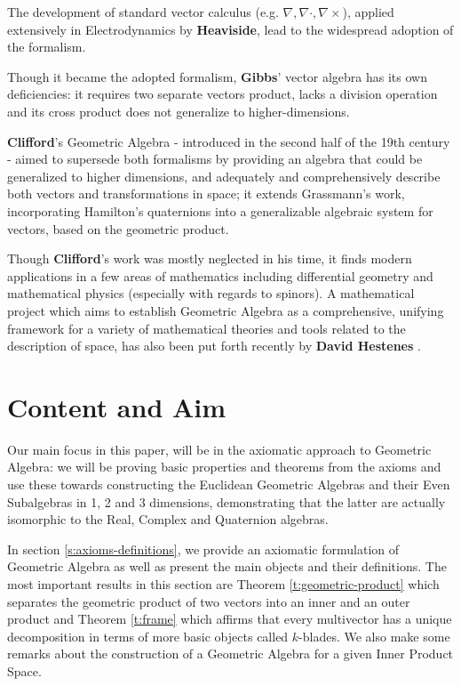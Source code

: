 The development of standard vector calculus (e.g. $\nabla, \nabla \cdot, \nabla \times$), applied extensively in Electrodynamics by \textbf{Heaviside}, lead to the widespread adoption of the formalism.

Though it became the adopted formalism, \textbf{Gibbs}' vector algebra has its own deficiencies: it requires two separate vectors product, lacks a division operation and its cross product does not generalize to higher-dimensions.

\textbf{Clifford}'s  Geometric Algebra - introduced in the second half of the 19th century - aimed to supersede both formalisms by providing an algebra that could be generalized to higher dimensions, and adequately and comprehensively describe both vectors and transformations in space; it extends Grassmann's work, incorporating Hamilton's quaternions into a generalizable algebraic system for vectors, based on the geometric product.

Though \textbf{Clifford}'s work was mostly neglected in his time, it finds modern applications in a few areas of mathematics including differential geometry and mathematical physics (especially with regards to spinors). A mathematical project which aims to establish Geometric Algebra as a comprehensive, unifying framework for a variety of mathematical theories and tools related to the description of space, has also been put forth recently by \textbf{David Hestenes} \cite{ga-origin}.%


\section{Content and Aim}

Our main focus in this paper, will be in the axiomatic approach to Geometric Algebra: we will be proving basic properties and theorems from the axioms and use these towards constructing the Euclidean Geometric Algebras and their Even Subalgebras in 1, 2 and 3 dimensions, demonstrating that the latter are actually isomorphic to the Real, Complex and Quaternion algebras.

In section \ref{s:axioms-definitions}, we provide an axiomatic formulation of Geometric Algebra as well as present the main objects and their definitions. The most important results in this section are Theorem \ref{t:geometric-product} which separates the geometric product of two vectors into an inner and an outer product and Theorem \ref{t:frame} which affirms that every multivector has a unique decomposition in terms of more basic objects called $k$-blades. We also make some remarks about the construction of a Geometric Algebra for a given Inner Product Space.

